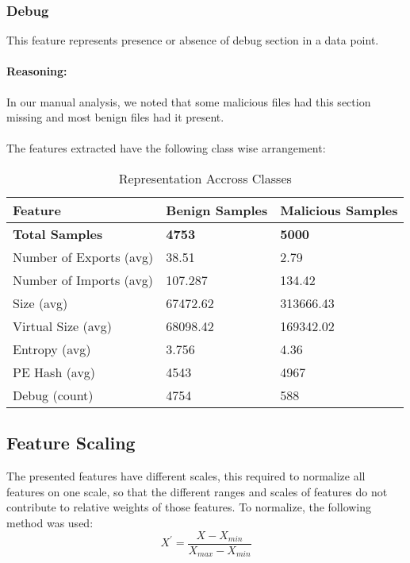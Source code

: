 \documentclass{llncs}
\begin{document}
\subsubsection{Debug}
This feature represents presence or absence of debug section in a data point.
\paragraph{Reasoning:}
In our manual analysis, we noted that some malicious files had this section missing and most benign files had it present.

\paragraph{}
The features extracted have the following class wise arrangement:

\begin{table}[h]
	\centering
	\caption{Representation Accross Classes}
	\begin{tabular}{ |p{5cm}||p{3cm}||p{3cm}|}
		\hline
		Feature						&Benign Samples 			&Malicious Samples\\
		\hline
		\textbf{Total Samples}				&\textbf{4753}						&\textbf{5000}\\
		\hline
		Number of Exports (avg)     	  &38.51						  &2.79\\
		Number of Imports (avg)   	  &107.287                          &134.42\\
		Size (avg)           					&67472.62					    &313666.43\\
		Virtual Size (avg)      			&68098.42				    &169342.02\\
		Entropy (avg)        					&3.756 							&4.36\\
		PE Hash (avg)        			&4543							&4967\\
		Debug (count)						&4754							&588\\
		 \hline
\end{tabular}
\label{table}
\end{table}


\subsection{Feature Scaling}
The presented features have different scales, this required to normalize all features on one scale, so that the different ranges and scales of features do not contribute to relative weights of those features. To normalize, the following method was used:
\[ X^{'} =\frac{X - X_{min}}{X_{max} - X_{min}}   \]
\end{document}
